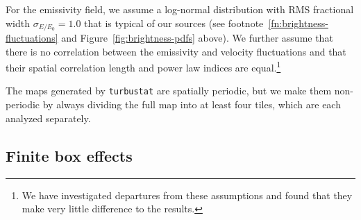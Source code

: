 \documentclass[fleqn,usenatbib, useAMS, a4paper]{mnras}
\newcommand\startNEW{\color{NEWcolor}}
\newcommand\stopNEW{\color{black}}
\newcommand\shortsig[1]{\ensuremath{\sigma_{#1/#1_0}}}
\begin{document}
For the emissivity field, we assume a log-normal distribution
with RMS fractional width
\(\shortsig{E} = 1.0\) that is typical of our sources
(see footnote~\ref{fn:brightness-fluctuations} and Figure~\ref{fig:brightness-pdfs} above).
We further assume that there is no correlation between the emissivity
and velocity fluctuations and that their spatial correlation length
and power law indices are equal.\footnote{%
  We have investigated departures from these assumptions and found that they
  make very little difference to the results.
}
\stopNEW

The maps generated by \texttt{turbustat} are spatially periodic,
but we make them non-periodic by always dividing the full map into at least
four tiles, which are each analyzed separately. 

\startNEW
\subsection{Finite box effects}
\label{sec:finite-box-effects}
\stopNEW
\end{document}
